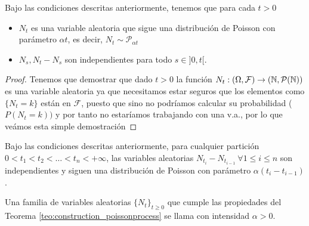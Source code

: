\begin{teo}\label{teo:construction_poissonprocess}
    Bajo las condiciones descritas anteriormente, tenemos que para cada $t> 0$
    \begin{itemize}
        \item $N_t$ es una variable aleatoria que sigue una distribución de Poisson con parámetro $\alpha t$, es decir, $N_t \sim \mathcal{P}_{\alpha t}$
        \item $N_s, N_t-N_s$ son independientes para todo $s\in]0,t[$.
    \end{itemize}
    \begin{proof}
        Tenemos que demostrar que dado $t> 0$ la función $N_t:(\Omega, \mathcal{F})\to (\mathbb{N}, \mathcal{P}(\mathbb{N}))$ es una variable aleatoria ya que necesitamos estar seguros que los elementos como $\{N_t=k\}$ están en $\mathcal{F}$, puesto que sino no podríamos calcular su probabilidad ($P(N_t=k))$ y por tanto no estaríamos trabajando con una v.a., por lo que veámos esta simple demostración
    \end{proof}
\end{teo}

\begin{teo}
    Bajo las condiciones descritas anteriormente, para cualquier partición $0<t_1 < t_2 < \ldots < t_n<+ \infty$, las variables aleatorias $N_{t_i}-N_{t_{i-1}} \ \forall 1\leq i \leq n$ son independientes y siguen una distribución de Poisson con parámetro $\alpha(t_i-t_{i-1})$.
\end{teo}

\begin{definicion} 
    Una familia de variables aleatorias $\{N_t\}_{t\geq 0}$ que cumple las propiedades del Teorema \ref{teo:construction_poissonprocess} se llama  con intensidad $\alpha>0$.
\end{definicion}


